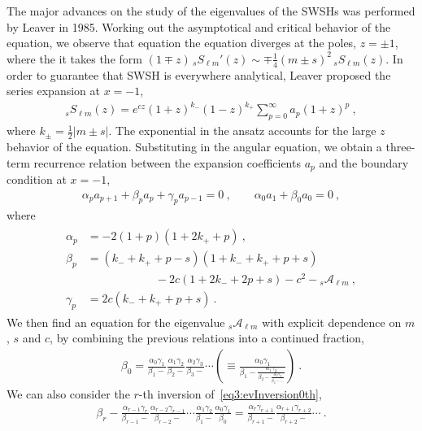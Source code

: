The major advances on the study of the eigenvalues of the SWSHs was performed by Leaver in 1985. Working out the asymptotical and critical behavior of the equation, we observe that equation the equation diverges at the poles, $z = \pm 1$, where the it takes the form $(1 \mp z) \,{}_{s}S_{\ell m}{}'(z) \sim \mp \tfrac{1}{4} (m \pm s)^2 \, {}_{s}S_{\ell m}(z)$. In order to guarantee that SWSH is everywhere analytical, Leaver proposed the series expansion at $x=-1$,
\begin{align}
    \label{eq3:SWSHseriesLeaver}
    {}_{s}S_{\ell m}(z) = e^{c z} (1+z)^{k_-} (1-z)^{k_+} \sum_{p=0}^\infty a_p (1+z)^p ~,
\end{align}
where $k_{\pm} = \tfrac{1}{2}|m \pm s|$.
The exponential in the ansatz accounts for the large $z$ behavior of the equation.
Substituting in the angular equation, we obtain a three-term recurrence relation between the expansion coefficients $a_p$ and the boundary condition at $x=-1$,
\begin{align}
    \label{eq3:ap3CoefRecursion}
    \alpha_p a_{p+1} + \beta_p a_p + \gamma_p a_{p-1} = 0 ~,\qquad
    \alpha_0 a_1 + \beta_0 a_0 = 0 ~,
\end{align}
where
\begin{align}
    \label{eq3:LeaverCoefRecursion}
    \begin{split}
        \alpha_p &= -2 (1 + p) (1 + 2 k_{+} + p) ~,\\
        \beta_p  &= (k_{-} + k_{+} + p - s) (1 + k_{-} + k_{+} + p + s) \\
        &\qquad\qquad\qquad - 2 c (1 + 2 k_{-} + 2 p + s) - c^2 - {}_{s}\mathscr{A}_{\ell m} ~,\\
        \gamma_p &= 2 c (k_{-} + k_{+} + p + s) ~.
    \end{split}
\end{align}
We then find an equation for the eigenvalue ${}_{s}\mathscr{A}_{\ell m}$ with explicit dependence on $m$, $s$ and $c$, by combining the previous relations into a continued fraction,
\begin{align}
    \label{eq3:evInversion0th}
    \beta_0 = \frac{\alpha_0 \gamma_1}{\beta_1 -} \frac{\alpha_1 \gamma_2}{\beta_2 -} \frac{\alpha_2 \gamma_3}{\beta_3 -} \cdots \left( \equiv  \frac{\alpha_0 \gamma_1}{\beta_1 - \frac{\alpha_1 \gamma_2}{\beta_2 - \frac{\alpha_2 \gamma_3}{\beta_3 - \dots}}} \right)  ~.
\end{align}
We can also consider the $r$-th inversion of~\eqref{eq3:evInversion0th},
\begin{align}
    \label{eq3:evInversionRth}
    \beta_r - \frac{\alpha_{r-1} \gamma_r}{\beta_{r-1} -} \frac{\alpha_{r-2} \gamma_{r-1}}{\beta_{r-2} -} \cdots \frac{\alpha_{1} \gamma_2}{\beta_{1} -} \frac{\alpha_{0} \gamma_{1}}{\beta_{0}} = \frac{\alpha_{r} \gamma_{r+1}}{\beta_{r+1} -} \frac{\alpha_{r+1} \gamma_{r+2}}{\beta_{r+2} -} \cdots ~.
\end{align}
